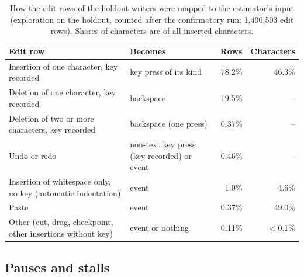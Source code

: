 \begin{table}
  \caption{How the edit rows of the holdout writers were mapped to the estimator's input (exploration on the holdout,
  counted after the confirmatory run; 1,490,503 edit rows). Shares of characters are of all inserted characters.}
  \label{tab:mapping}
  \centering\small
  \begin{tabularx}{\linewidth}{>{\raggedright\arraybackslash}X >{\raggedright\arraybackslash}p{2.9cm} r r}
    \toprule
    Edit row & Becomes & Rows & Characters \\
    \midrule
    Insertion of one character, key recorded & key press of its kind & 78.2\% & 46.3\% \\
    Deletion of one character, key recorded & backspace & 19.5\% & -- \\
    Deletion of two or more characters, key recorded & backspace (one press) & 0.37\% & -- \\
    Undo or redo & non-text key press (key recorded) or event & 0.46\% & -- \\
    Insertion of whitespace only, no key (automatic indentation) & event & 1.0\% & 4.6\% \\
    Paste & event & 0.37\% & 49.0\% \\
    Other (cut, drag, checkpoint, other insertions without key) & event or nothing & 0.11\% & $<$0.1\% \\
    \bottomrule
  \end{tabularx}
\end{table}

\subsection{Pauses and stalls}

